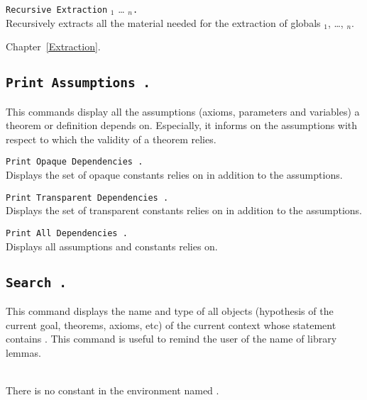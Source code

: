 \begin{Variants}
\item \texttt{Recursive Extraction} {\qualid$_1$} \ldots{} {\qualid$_n$}{\tt .}\\
  Recursively extracts all the material needed for the extraction of 
  globals {\qualid$_1$}, \ldots, {\qualid$_n$}.
\end{Variants}

\SeeAlso Chapter~\ref{Extraction}.

\subsection[\tt Print Assumptions {\qualid}.]{\tt Print Assumptions {\qualid}.}
\label{PrintAssumptions}

This commands display all the assumptions (axioms, parameters and
variables) a theorem or definition depends on.  Especially, it informs
on the assumptions with respect to which the validity of a theorem
relies.

\begin{Variants}
\item \texttt{\tt Print Opaque Dependencies {\qualid}.
  }\\
  Displays the set of opaque constants {\qualid} relies on in addition
  to the assumptions.
\item \texttt{\tt Print Transparent Dependencies {\qualid}.
  }\\
  Displays the set of transparent constants {\qualid} relies on in addition
  to the assumptions.
\item \texttt{\tt Print All Dependencies {\qualid}.
  }\\
  Displays all assumptions and constants {\qualid} relies on.
\end{Variants}

\subsection[\tt Search {\qualid}.]{\tt Search {\qualid}.}
This command displays the name and type of all objects (hypothesis of
the current goal, theorems, axioms, etc) of the current context whose
statement contains \qualid. This command is useful to remind the user
of the name of library lemmas.

\begin{ErrMsgs}
\item {}\\
    There is no constant in the environment named \qualid.
\end{ErrMsgs}

